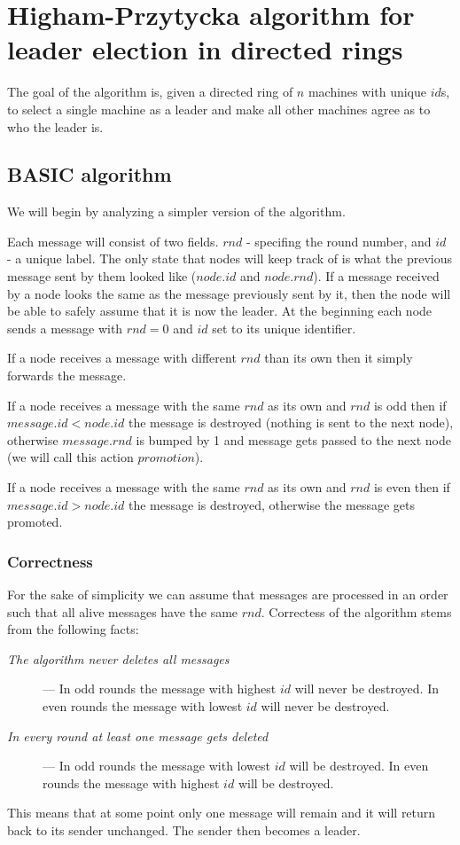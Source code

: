 \documentclass{article}
\begin{document}
\section*{Higham-Przytycka algorithm for leader election in directed rings}
The goal of the algorithm is, given a directed ring of $n$ machines with unique $id$s, to select a single machine as a leader and make all other machines agree as to who the leader is.
\subsection*{BASIC algorithm}
We will begin by analyzing a simpler version of the algorithm.

Each message will consist of two fields. $rnd$ - specifing the round number, and $id$ - a unique label. The only state that nodes will keep track of is what the previous message sent by them looked like ($node.id$ and $node.rnd$). If a message received by a node looks the same as the message previously sent by it, then the node will be able to safely assume that it is now the leader. At the beginning each node sends a message with $rnd = 0$ and $id$ set to its unique identifier.

If a node receives a message with different $rnd$ than its own then it simply forwards the message.

If a node receives a message with the same $rnd$ as its own and $rnd$ is odd then if $message.id < node.id$ the message is destroyed (nothing is sent to the next node), otherwise $message.rnd$ is bumped by 1 and message gets passed to the next node (we will call this action $promotion$).

If a node receives a message with the same $rnd$ as its own and $rnd$ is even then if $message.id > node.id$ the message is destroyed, otherwise the message gets promoted.
\subsubsection*{Correctness}
For the sake of simplicity we can assume that messages are processed in an order such that all alive messages have the same $rnd$. Correctess of the algorithm stems from the following facts:
\begin{description}
\item[\textit{The algorithm never deletes all messages}] --- In odd rounds the message with highest $id$ will never be destroyed. In even rounds the message with lowest $id$ will never be destroyed.
\item[\textit{In every round at least one message gets deleted}] --- In odd rounds the message with lowest $id$ will be destroyed. In even rounds the message with highest $id$ will be destroyed.
\end{description}
This means that at some point only one message will remain and it will return back to its sender unchanged. The sender then becomes a leader.
\end{document}
